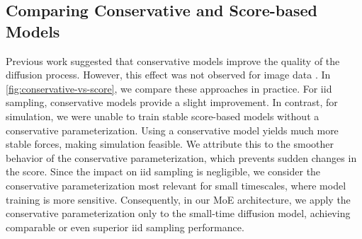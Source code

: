 \subsection{Comparing Conservative and Score-based Models} \label{appx:conservative-vs-score}
Previous work \citep{arts2023} suggested that conservative models improve the quality of the diffusion process. However, this effect was not observed for image data \citep{salimans2021escore}. In \cref{fig:conservative-vs-score}, we compare these approaches in practice. For iid sampling, conservative models provide a slight improvement. In contrast, for simulation, we were unable to train stable score-based models without a conservative parameterization. Using a conservative model yields much more stable forces, making simulation feasible. We attribute this to the smoother behavior of the conservative parameterization, which prevents sudden changes in the score. Since the impact on iid sampling is negligible, we consider the conservative parameterization most relevant for small timescales, where model training is more sensitive. Consequently, in our \gls{MoE} architecture, we apply the conservative parameterization only to the small-time diffusion model, achieving comparable or even superior iid sampling performance.

